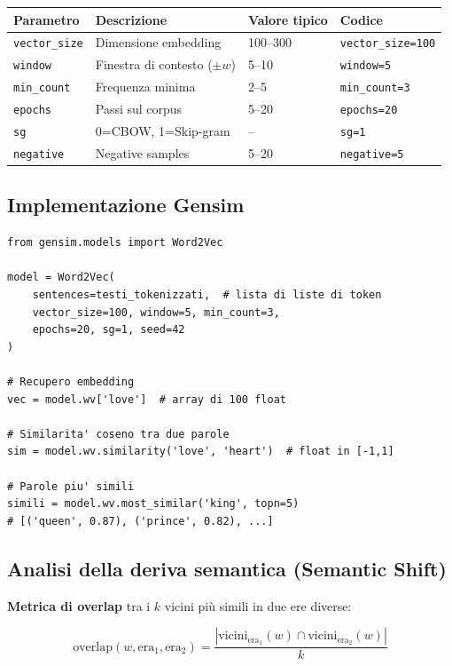 \documentclass[12pt,a4paper]{article}
\begin{document}
\begin{center}
\begin{tabular}{llll}
\toprule
\textbf{Parametro} & \textbf{Descrizione} & \textbf{Valore tipico} & \textbf{Codice} \\
\midrule
\texttt{vector\_size} & Dimensione embedding & 100--300 & \texttt{vector\_size=100} \\
\texttt{window} & Finestra di contesto ($\pm w$) & 5--10 & \texttt{window=5} \\
\texttt{min\_count} & Frequenza minima & 2--5 & \texttt{min\_count=3} \\
\texttt{epochs} & Passi sul corpus & 5--20 & \texttt{epochs=20} \\
\texttt{sg} & 0=CBOW, 1=Skip-gram & -- & \texttt{sg=1} \\
\texttt{negative} & Negative samples & 5--20 & \texttt{negative=5} \\
\bottomrule
\end{tabular}
\end{center}

\subsection{Implementazione Gensim}

\begin{lstlisting}
from gensim.models import Word2Vec

model = Word2Vec(
    sentences=testi_tokenizzati,  # lista di liste di token
    vector_size=100, window=5, min_count=3,
    epochs=20, sg=1, seed=42
)

# Recupero embedding
vec = model.wv['love']  # array di 100 float

# Similarita' coseno tra due parole
sim = model.wv.similarity('love', 'heart')  # float in [-1,1]

# Parole piu' simili
simili = model.wv.most_similar('king', topn=5)
# [('queen', 0.87), ('prince', 0.82), ...]
\end{lstlisting}

\subsection{Analisi della deriva semantica (Semantic Shift)}

\textbf{Metrica di overlap} tra i $k$ vicini più simili in due ere diverse:

\begin{formulabox}
\[
\text{overlap}(w, \text{era}_1, \text{era}_2) = \frac{|\text{vicini}_{\text{era}_1}(w) \cap \text{vicini}_{\text{era}_2}(w)|}{k}
\]
\end{formulabox}
\end{document}
